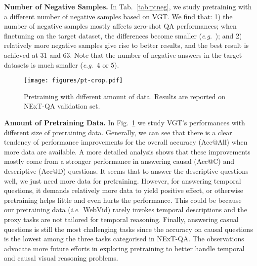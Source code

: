 \documentclass[10pt,journal,compsoc]{IEEEtran}
\newcommand{\ie}{\textit{i}.\textit{e}.}
\newcommand{\eg}{\textit{e}.\textit{g}.}
\begin{document}
\setlength{\tabcolsep}{8pt}
\begin{table}[t!]
    \small
    \centering
    \caption{Contrastive pretraining with a different number of negative samples. Results are reported on NExT-QA test set.}
    \label{tab:ptneg}
    \vspace{-0.5em}
    \vspace{-0.4cm}
\end{table}
\textbf{Number of Negative Samples.}
In Tab.~\ref{tab:ptneg}, we study pretraining with a different number of negative samples based on VGT. We find that:
1) the number of negative samples mostly affects zero-shot QA performances; when finetuning on the target dataset, the differences become smaller (\eg~); and
2) relatively more negative samples give rise to better results, and the best result is achieved at 31 and 63. Note that the number of negative answers in the target datasets is much smaller (\eg~4 or 5).
\begin{figure}[t!]
  \begin{center}
    \texttt{[image: figures/pt-crop.pdf]}
  \end{center}
  \vspace{-1em}
  \caption{Pretraining with different amount of data. Results are reported on NExT-QA validation set.}
  \label{fig:pts}
\end{figure}

\textbf{Amount of Pretraining Data.}
In Fig.~\ref{fig:pts} we study VGT's performances with different size of pretraining data. Generally, we can see that there is a clear tendency of performance improvements for the overall accuracy (Acc@All) when more data are available. A more detailed analysis shows that these improvements mostly come from a stronger performance in answering causal (Acc@C) and descriptive (Acc@D) questions. It seems that to answer the descriptive questions well, we just need more data for pretraining. However, for answering temporal questions, it demands relatively more data to yield positive effect, or otherwise pretraining helps little and even hurts the performance. This could be because our pretraining data (\ie~WebVid) rarely invokes temporal descriptions and the proxy tasks are not tailored for temporal reasoning. 
Finally, answering casual questions is still the most challenging tasks since the accuracy on causal questions is the lowest among the three tasks categorised in NExT-QA. The observations advocate more future efforts in exploring pretraining to better handle temporal and causal visual reasoning problems.
\end{document}
